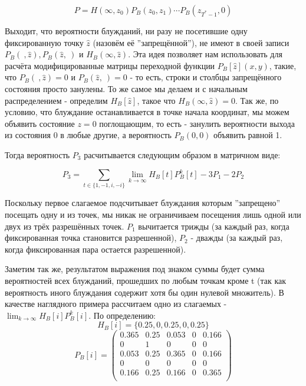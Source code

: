 \[ P = H(\infty, z_0) P_B(z_0, z_1) \cdots P_B(z_{T^*-1}, 0) \]

Выходит, что вероятности блужданий, ни разу не посетившие одну фиксированную точку $\hat z$ (назовём её ''запрещённой''), не имеют в своей записи $P_B(\ , \hat z), P_B(\hat z,\ )$ и $H_B(\infty, \hat z)$.
Эта идея позволяет нам использовать для расчёта модифицированные матрицы переходной функции $P_B[\hat z](x,y)$, такие, что $P_B(\ , \hat z) = 0$ и $P_B(\hat z,\ ) = 0$ - то есть,
строки и столбцы запрещённого состояния просто занулены. То же самое мы делаем и с начальным распределением - определим $H_B [\hat z]$, такое что $H_B(\infty, \hat z) = 0$.
Так же, по условию, что блуждание останавливается в точке начала координат, мы можем объявить состояние $z=0$ поглощающим, то есть - занулить вероятности выхода из состояния 0 в любые другие, а вероятность $P_B(0,0)$ объявить равной 1.

Тогда вероятность $P_3$ расчитывается следующим образом в матричном виде:

\begin{equation}
P_3 = \sum_{t \in \{1, -1, i,  -i\}} \lim_{k \to \infty} H_B[t] P_B^k[t] - 3 P_1 - 2 P_2
\end{equation}

Поскольку первое слагаемое подсчитывает блуждания которым ''запрещено'' посещать одну и из точек, мы никак не ограничиваем посещения лишь одной или двух из трёх разрешённых точек.
$P_1$ вычитается трижды (за каждый раз, когда фиксированная точка становится разрешенной), $P_2$ - дважды (за каждый раз, когда фиксированная пара остается разрешенной).

Заметим так же, результатом выражения под знаком суммы будет сумма вероятностей всех блужданий, прошедших по любым точкам кроме t (так как вероятность иного блуждания содержит хотя бы один нулевой множитель).
В качестве наглядного примера рассчитаем одно из слагаемых - $\lim_{k \to \infty} H_B[i] P_B^k[i]$. По определению: 
\[ H_B[i] = \{0.25, 0, 0.25, 0, 0.25\} \]
\begin{equation*}
 P_B[i] = 
 \begin{pmatrix}
	0.365 & 0.25 & 0.053 & 0 & 0.166 \\
	0 & 1 & 0 & 0 & 0 \\
	0.053 & 0.25 & 0.365 & 0 &  0.166 \\
	0 & 0 & 0 & 0 & 0 \\
	0.166 & 0.25 & 0.166 & 0 & 0.365\\
 \end{pmatrix} 
\end{equation*}


